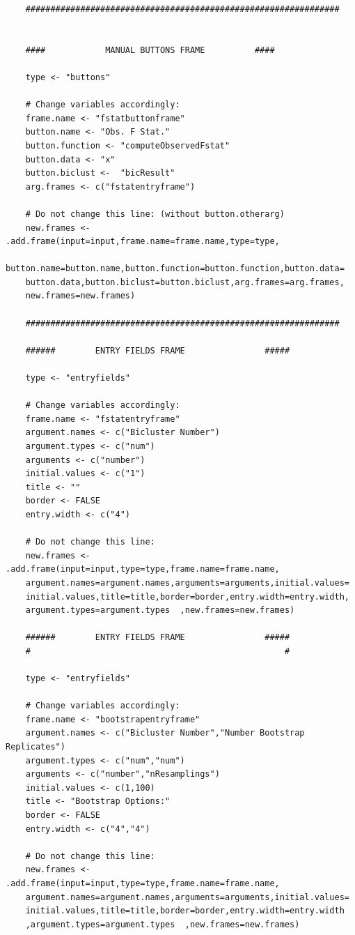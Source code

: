 \documentclass[a4paper]{article}\usepackage[]{graphicx}\usepackage[]{color}
\begin{document}
\begin{verbatim}
	###############################################################
	
	
	####	    	MANUAL BUTTONS FRAME		  ####
	
	type <- "buttons"
	
	# Change variables accordingly:
	frame.name <- "fstatbuttonframe"  
	button.name <- "Obs. F Stat."  
	button.function <- "computeObservedFstat" 
	button.data <- "x" 
	button.biclust <-  "bicResult" 
	arg.frames <- c("fstatentryframe") 
	
	# Do not change this line: (without button.otherarg)
	new.frames <- .add.frame(input=input,frame.name=frame.name,type=type,
    button.name=button.name,button.function=button.function,button.data=
    button.data,button.biclust=button.biclust,arg.frames=arg.frames,
    new.frames=new.frames)
	
	###############################################################
	
	######		  ENTRY FIELDS FRAME 				#####
	
	type <- "entryfields"
	
	# Change variables accordingly:
	frame.name <- "fstatentryframe"  
	argument.names <- c("Bicluster Number") 
	argument.types <- c("num")
	arguments <- c("number")
	initial.values <- c("1")
	title <- ""
	border <- FALSE
	entry.width <- c("4")  
	
	# Do not change this line:
	new.frames <- .add.frame(input=input,type=type,frame.name=frame.name,
    argument.names=argument.names,arguments=arguments,initial.values=
    initial.values,title=title,border=border,entry.width=entry.width,
    argument.types=argument.types  ,new.frames=new.frames)
	
	######		  ENTRY FIELDS FRAME 				#####
	#							    		 			#
	
	type <- "entryfields"
	
	# Change variables accordingly:
	frame.name <- "bootstrapentryframe"  
	argument.names <- c("Bicluster Number","Number Bootstrap Replicates") 
	argument.types <- c("num","num")
	arguments <- c("number","nResamplings")
	initial.values <- c(1,100)
	title <- "Bootstrap Options:"
	border <- FALSE
	entry.width <- c("4","4")  
	
	# Do not change this line:
	new.frames <- .add.frame(input=input,type=type,frame.name=frame.name,
    argument.names=argument.names,arguments=arguments,initial.values=
    initial.values,title=title,border=border,entry.width=entry.width
    ,argument.types=argument.types  ,new.frames=new.frames)
	

\end{verbatim}
\end{document}
